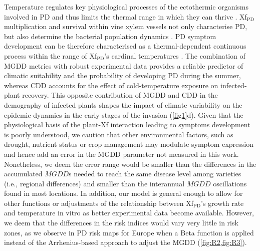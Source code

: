     Temperature regulates key physiological processes of the ectothermic
    organisms
    involved in PD and thus limits the thermal range in which they can thrive
    \cite{Coakley1999}. Xf$_{\textrm{PD}}$ multiplication and survival within
    vine
    xylem vessels not only characterise PD, but also determine the bacterial
    population dynamics \cite{fry1990multiplication,Feil2001}. PD symptom
    development can be therefore characterised as a thermal-dependent
    continuous
    process within the range of  Xf$_{\textrm{PD}}$'s cardinal temperatures
    \cite{Scherm1994}. The combination of MGDD metrics with robust experimental
    data provides a reliable predictor of climatic suitability and the
    probability
    of developing PD during the summer, whereas CDD accounts for the effect of
    cold-temperature exposure on infected-plant recovery. This opposite
    contribution of MGDD and CDD in the demography of infected plants shapes
    the
    impact of climate variability on the epidemic dynamics in the early stages
    of
    the invasion (\cref{fig1}d). Given that the physiological basis of the
    plant-Xf
    interaction leading to symptoms development is poorly understood, we
    caution
    that other environmental factors, such as drought, nutrient status or crop
    management may modulate symptom expression and hence add an error in the
    MGDD
    parameter not measured in this work. Nonetheless, we deem the error range
    would
    be smaller than the differences in the accumulated $MGDD$s needed to reach
    the
    same disease level among varieties (i.e., regional differences) and smaller
    than the interannual $MGDD$ oscillations found in most locations. In
    addition,
    our model is general enough to allow for other functions or adjustments of
    the
    relationship between Xf$_{\textrm{PD}}$'s growth rate and temperature in
    vitro
    as better experimental data become available. However, we deem that the
    differences in the risk indices would vary very little in risk zones, as we
    observe in PD risk maps for Europe when a Beta function is applied instead
    of
    the Arrhenius-based approach to adjust the MGDD (\cref{fig:R2,fig:R3}).

